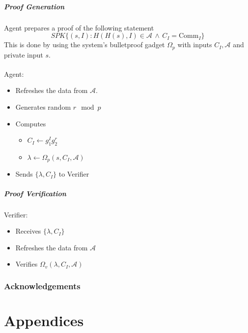 \documentclass[a4paper]{article}
\begin{document}
\subsubsection{Proof Generation}
Agent prepares a proof of the following statement
$$
SPK\{(s,I): H(H(s),I)\in \mathcal{A}\,\wedge\,C_I = \mathrm{Comm}_I\}
$$
This is done by using the system's bulletproof gadget $\Omega_p$ with inputs $C_I,\mathcal{A}$ and private input $s$.\\\\
Agent:
\begin{itemize}
    \item Refreshes the data from $\mathcal{A}$.
    \item Generates random $r \mod p$
    \item Computes
    \begin{itemize}
        \item $C_I \leftarrow g_1^Ig_2^r$
        \item $\lambda \leftarrow \Omega_p(s, C_I, \mathcal{A})$
    \end{itemize}
    \item Sends $\{\lambda, C_I\}$ to Verifier
\end{itemize}

\subsubsection{Proof Verification}
Verifier:
\begin{itemize}
    \item Receives $\{\lambda, C_I\}$
    \item Refreshes the data from $\mathcal{A}$
    \item Verifies $\Omega_v(\lambda, C_I, \mathcal{A})$
\end{itemize}

\section{Acknowledgements}




\part{Appendices}
\appendix
\end{document}
